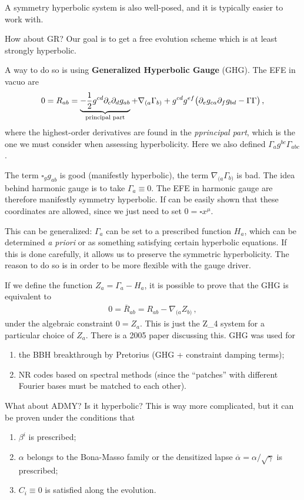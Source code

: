 \documentclass[main.tex]{subfiles}
\begin{document}
A symmetry hyperbolic system is also well-posed, and it is typically easier to work with. 

How about GR? Our goal is to get a free evolution scheme which is at least strongly hyperbolic.

A way to do so is using \textbf{Generalized Hyperbolic Gauge} (GHG). 
The EFE in vacuo are 
%
\begin{align}
0 = R_{ab} = \underbrace{- \frac{1}{2} g^{cd} \partial_{c} \partial_{d} g_{ab}}_{\text{principal part}} + \nabla_{(a} \Gamma_{b)} + g^{cd} g^{ef} 
\qty( \partial_{e} g_{ca} \partial_{f} g_{bd} - \Gamma \Gamma )
\,,
\end{align}
%
where the highest-order derivatives are found in the \emph{pprincipal part}, which is the one we must consider when assessing hyperbolicity. 
Here we also defined \(\Gamma_{a} g^{bc} \Gamma_{abc}\). 

The term \(\square_g g_{ab}\) is good (manifestly hyperbolic), the term \(\nabla_{(a} \Gamma_{b)}\) is bad. The idea behind harmonic gauge is to take \(\Gamma_a \equiv 0\). 
The EFE in harmonic gauge are therefore manifestly symmetry hyperbolic. 
If can be easily shown that these coordinates are allowed, since we just need to set \(0 = \square x^{\mu }\). 

This can be generalized: \(\Gamma _a\) can be set to a prescribed function \(H_a\), which can be determined \emph{a priori} or as something satisfying certain hyperbolic equations. 
If this is done carefully, it allows us to preserve the symmetric hyperbolicity. 
The reason to do so is in order to be more flexible with the gauge driver. 

If we define the function \(Z_a = \Gamma _a - H_a\), it is possible to prove that the GHG is equivalent to 
%
\begin{align}
0 = \overline{R}_{ab} = R_{ab} - \nabla_{(a } Z_{b)}
\,,
\end{align}
%
under the algebraic constraint \(0 = Z_a\). 
This is just the Z_4 system for a particular choice of \(Z_a\). 
There is a 2005 paper discussing this. 
GHG was used for 
\begin{enumerate}
    \item the BBH breakthrough by Pretorius (GHG + constraint damping terms);
    \item NR codes based on spectral methods (since the ``patches'' with different Fourier bases must be matched to each other).
\end{enumerate}

What about ADMY? Is it hyperbolic? 
This is way more complicated, but it can be proven under the conditions that 
\begin{enumerate}
    \item \(\beta^{i}\) is prescribed;
    \item \(\alpha \) belongs to the Bona-Masso family or the densitized lapse \(\overline{\alpha} = \alpha / \sqrt{\gamma }\) is prescribed;
    \item \(C_i \equiv 0\) is satisfied along the evolution.
\end{enumerate}
\end{document}
